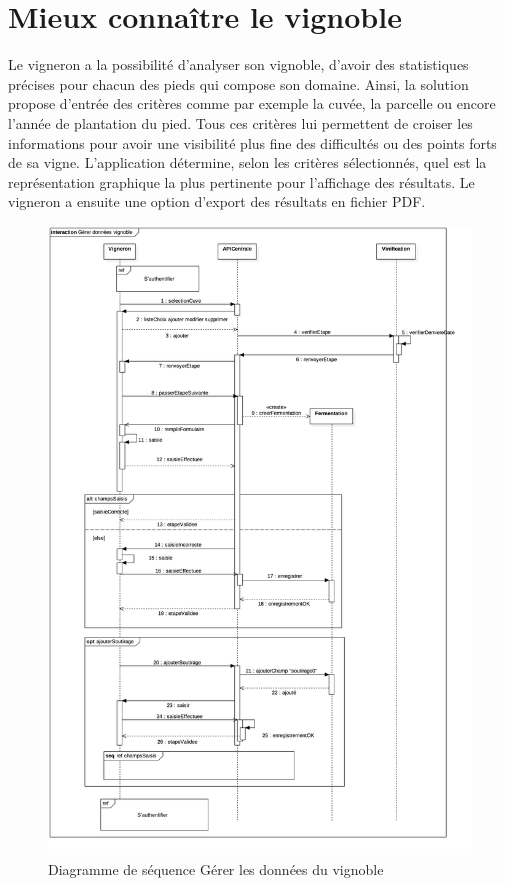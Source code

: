 \documentclass[a4paper, titlepage]{report}
\begin{document}
\section{Mieux connaître le vignoble}

Le vigneron a la possibilité d'analyser son vignoble, d'avoir des
statistiques précises pour chacun des pieds qui compose son domaine.
Ainsi, la solution propose d'entrée des critères comme par exemple la
cuvée, la parcelle ou encore l'année de plantation du pied. Tous ces
critères lui permettent de croiser les informations pour avoir une
visibilité plus fine des difficultés ou des points forts de sa vigne.
L'application détermine, selon les critères sélectionnés, quel est la
représentation graphique la plus pertinente pour l'affichage des
résultats. Le vigneron a ensuite une option d'export des résultats en
fichier PDF.

\begin{figure}[!h]
\centering
\includegraphics{Images/SequenceDiagramGererDonneesVignoble}
\caption{Diagramme de séquence Gérer les données du vignoble}
\end{figure}
\end{document}
